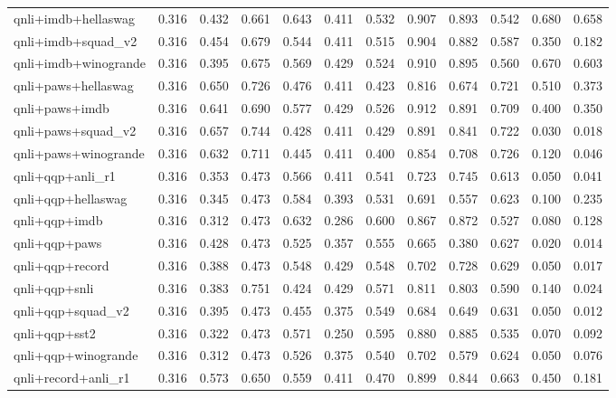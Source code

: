 \begin{table}[t]
\begin{tabular}{lrrrrrrrrrrr}
    qnli+imdb+hellaswag & 0.316 & 0.432 & 0.661 & 0.643 & 0.411 & 0.532 & 0.907 & 0.893 & 0.542 & 0.680 & 0.658 \\
    qnli+imdb+squad\_v2 & 0.316 & 0.454 & 0.679 & 0.544 & 0.411 & 0.515 & 0.904 & 0.882 & 0.587 & 0.350 & 0.182 \\
    qnli+imdb+winogrande & 0.316 & 0.395 & 0.675 & 0.569 & 0.429 & 0.524 & 0.910 & 0.895 & 0.560 & 0.670 & 0.603 \\
    qnli+paws+hellaswag & 0.316 & 0.650 & 0.726 & 0.476 & 0.411 & 0.423 & 0.816 & 0.674 & 0.721 & 0.510 & 0.373 \\
    qnli+paws+imdb & 0.316 & 0.641 & 0.690 & 0.577 & 0.429 & 0.526 & 0.912 & 0.891 & 0.709 & 0.400 & 0.350 \\
    qnli+paws+squad\_v2 & 0.316 & 0.657 & 0.744 & 0.428 & 0.411 & 0.429 & 0.891 & 0.841 & 0.722 & 0.030 & 0.018 \\
    qnli+paws+winogrande & 0.316 & 0.632 & 0.711 & 0.445 & 0.411 & 0.400 & 0.854 & 0.708 & 0.726 & 0.120 & 0.046 \\
    qnli+qqp+anli\_r1 & 0.316 & 0.353 & 0.473 & 0.566 & 0.411 & 0.541 & 0.723 & 0.745 & 0.613 & 0.050 & 0.041 \\
    qnli+qqp+hellaswag & 0.316 & 0.345 & 0.473 & 0.584 & 0.393 & 0.531 & 0.691 & 0.557 & 0.623 & 0.100 & 0.235 \\
    qnli+qqp+imdb & 0.316 & 0.312 & 0.473 & 0.632 & 0.286 & 0.600 & 0.867 & 0.872 & 0.527 & 0.080 & 0.128 \\
    qnli+qqp+paws & 0.316 & 0.428 & 0.473 & 0.525 & 0.357 & 0.555 & 0.665 & 0.380 & 0.627 & 0.020 & 0.014 \\
    qnli+qqp+record & 0.316 & 0.388 & 0.473 & 0.548 & 0.429 & 0.548 & 0.702 & 0.728 & 0.629 & 0.050 & 0.017 \\
    qnli+qqp+snli & 0.316 & 0.383 & 0.751 & 0.424 & 0.429 & 0.571 & 0.811 & 0.803 & 0.590 & 0.140 & 0.024 \\
    qnli+qqp+squad\_v2 & 0.316 & 0.395 & 0.473 & 0.455 & 0.375 & 0.549 & 0.684 & 0.649 & 0.631 & 0.050 & 0.012 \\
    qnli+qqp+sst2 & 0.316 & 0.322 & 0.473 & 0.571 & 0.250 & 0.595 & 0.880 & 0.885 & 0.535 & 0.070 & 0.092 \\
    qnli+qqp+winogrande & 0.316 & 0.312 & 0.473 & 0.526 & 0.375 & 0.540 & 0.702 & 0.579 & 0.624 & 0.050 & 0.076 \\
    qnli+record+anli\_r1 & 0.316 & 0.573 & 0.650 & 0.559 & 0.411 & 0.470 & 0.899 & 0.844 & 0.663 & 0.450 & 0.181 \\

\end{tabular}
\end{table}
